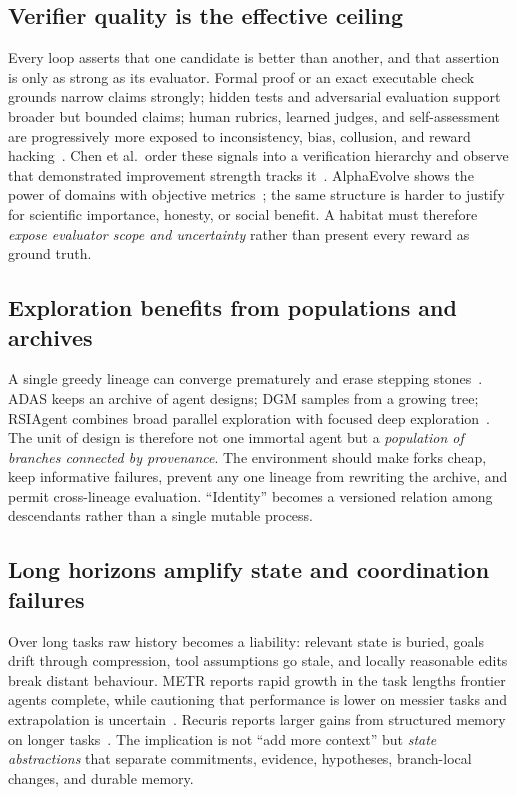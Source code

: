 \documentclass[11pt,a4paper]{article}
\begin{document}
\subsection{Verifier quality is the effective ceiling}
Every loop asserts that one candidate is better than another, and that assertion is only as strong as its evaluator. Formal proof or an exact executable check grounds narrow claims strongly; hidden tests and adversarial evaluation support broader but bounded claims; human rubrics, learned judges, and self-assessment are progressively more exposed to inconsistency, bias, collusion, and reward hacking~\cite{skalse2022rewardhacking,denison2024subterfuge}. Chen et al.\ order these signals into a verification hierarchy and observe that demonstrated improvement strength tracks it~\cite{chen2026survey}. AlphaEvolve shows the power of domains with objective metrics~\cite{alphaevolve2025}; the same structure is harder to justify for scientific importance, honesty, or social benefit. A habitat must therefore \emph{expose evaluator scope and uncertainty} rather than present every reward as ground truth.

\subsection{Exploration benefits from populations and archives}
A single greedy lineage can converge prematurely and erase stepping stones~\cite{lehman2011novelty}. ADAS keeps an archive of agent designs; DGM samples from a growing tree; RSIAgent combines broad parallel exploration with focused deep exploration~\cite{hu2024adas,zhang2025dgm,zhu2026rsiagent}. The unit of design is therefore not one immortal agent but a \emph{population of branches connected by provenance}. The environment should make forks cheap, keep informative failures, prevent any one lineage from rewriting the archive, and permit cross-lineage evaluation. ``Identity'' becomes a versioned relation among descendants rather than a single mutable process.

\subsection{Long horizons amplify state and coordination failures}
Over long tasks raw history becomes a liability: relevant state is buried, goals drift through compression, tool assumptions go stale, and locally reasonable edits break distant behaviour. METR reports rapid growth in the task lengths frontier agents complete, while cautioning that performance is lower on messier tasks and extrapolation is uncertain~\cite{metr2026horizons}. Recuris reports larger gains from structured memory on longer tasks~\cite{yu2026recuris}. The implication is not ``add more context'' but \emph{state abstractions} that separate commitments, evidence, hypotheses, branch-local changes, and durable memory.
\end{document}

